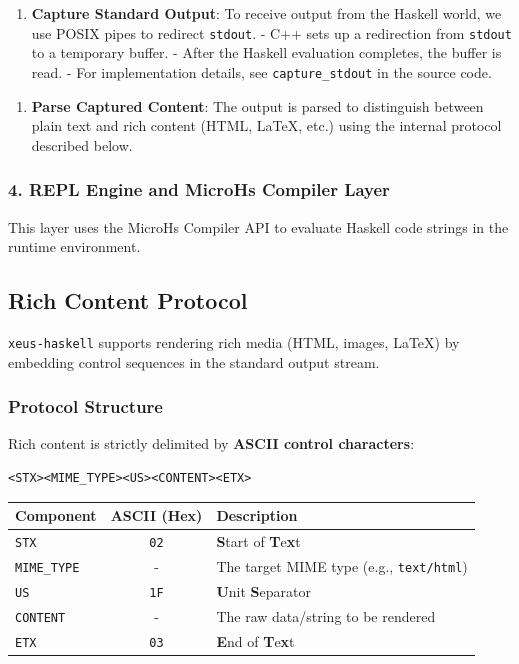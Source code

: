 \begin{enumerate}
\item \textbf{Capture Standard Output}:
   To receive output from the Haskell world, we use POSIX pipes to redirect \texttt{stdout}.   - C++ sets up a redirection from \texttt{stdout} to a temporary buffer.   - After the Haskell evaluation completes, the buffer is read.   - For implementation details, see \texttt{capture\_stdout} in the source code.\end{enumerate}


\begin{enumerate}
\item \textbf{Parse Captured Content}:
   The output is parsed to distinguish between plain text and rich content (HTML, LaTeX, etc.) using the internal protocol described below.\end{enumerate}


\subsubsection{4. REPL Engine and MicroHs Compiler Layer}


This layer uses the MicroHs Compiler API to evaluate Haskell code strings in the runtime environment.
\subsection{Rich Content Protocol}


\texttt{xeus-haskell} supports rendering rich media (HTML, images, LaTeX) by embedding control sequences in the standard output stream.
\subsubsection{Protocol Structure}


Rich content is strictly delimited by \textbf{ASCII control characters}:
\begin{verbatim}
<STX><MIME_TYPE><US><CONTENT><ETX>
\end{verbatim}


\begin{center}
\begin{tabular}{|l|c|p{8cm}|}
\hline
\textbf{Component} & \textbf{ASCII (Hex)} & \textbf{Description} \\
\hline
\texttt{STX} & \texttt{02} & \textbf{S}tart of \textbf{T}e\textbf{x}t \\
\hline
\texttt{MIME\_TYPE} & - & The target MIME type (e.g., \texttt{text/html}) \\
\hline
\texttt{US} & \texttt{1F} & \textbf{U}nit \textbf{S}eparator \\
\hline
\texttt{CONTENT} & - & The raw data/string to be rendered \\
\hline
\texttt{ETX} & \texttt{03} & \textbf{E}nd of \textbf{T}e\textbf{x}t \\
\hline
\end{tabular}
\end{center}
